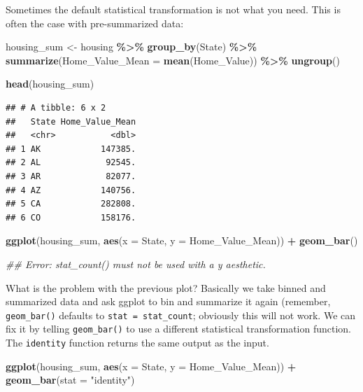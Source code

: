 \documentclass[
]{book}
\newenvironment{Shaded}{\begin{snugshade}}{\end{snugshade}}
\newcommand{\CommentTok}[1]{\textcolor[rgb]{0.56,0.35,0.01}{\textit{#1}}}
\newcommand{\DataTypeTok}[1]{\textcolor[rgb]{0.13,0.29,0.53}{#1}}
\newcommand{\KeywordTok}[1]{\textcolor[rgb]{0.13,0.29,0.53}{\textbf{#1}}}
\newcommand{\NormalTok}[1]{#1}
\newcommand{\OperatorTok}[1]{\textcolor[rgb]{0.81,0.36,0.00}{\textbf{#1}}}
\newcommand{\StringTok}[1]{\textcolor[rgb]{0.31,0.60,0.02}{#1}}
\begin{document}
Sometimes the default statistical transformation is not what you need. This is often the case with pre-summarized data:

\begin{Shaded}
\begin{Highlighting}[]
\NormalTok{housing\_sum \textless{}{-}}\StringTok{ }
\StringTok{  }\NormalTok{housing }\OperatorTok{\%\textgreater{}\%}
\StringTok{  }\KeywordTok{group\_by}\NormalTok{(State) }\OperatorTok{\%\textgreater{}\%}
\StringTok{  }\KeywordTok{summarize}\NormalTok{(}\DataTypeTok{Home\_Value\_Mean =} \KeywordTok{mean}\NormalTok{(Home\_Value)) }\OperatorTok{\%\textgreater{}\%}
\StringTok{  }\KeywordTok{ungroup}\NormalTok{()}

\KeywordTok{head}\NormalTok{(housing\_sum)}
\end{Highlighting}
\end{Shaded}

\begin{verbatim}
## # A tibble: 6 x 2
##   State Home_Value_Mean
##   <chr>           <dbl>
## 1 AK            147385.
## 2 AL             92545.
## 3 AR             82077.
## 4 AZ            140756.
## 5 CA            282808.
## 6 CO            158176.
\end{verbatim}

\begin{Shaded}
\begin{Highlighting}[]
\KeywordTok{ggplot}\NormalTok{(housing\_sum, }\KeywordTok{aes}\NormalTok{(}\DataTypeTok{x =}\NormalTok{ State, }\DataTypeTok{y =}\NormalTok{ Home\_Value\_Mean)) }\OperatorTok{+}\StringTok{ }
\StringTok{  }\KeywordTok{geom\_bar}\NormalTok{()}

\CommentTok{\#\# Error: stat\_count() must not be used with a y aesthetic.  }
\end{Highlighting}
\end{Shaded}

What is the problem with the previous plot? Basically we take binned and summarized data and ask ggplot to bin and summarize it again (remember, \texttt{geom\_bar()} defaults to \texttt{stat\ =\ stat\_count}; obviously this will not work. We can fix it by telling \texttt{geom\_bar()} to use a different statistical transformation function. The \texttt{identity} function returns the same output as the input.

\begin{Shaded}
\begin{Highlighting}[]
\KeywordTok{ggplot}\NormalTok{(housing\_sum, }\KeywordTok{aes}\NormalTok{(}\DataTypeTok{x =}\NormalTok{ State, }\DataTypeTok{y =}\NormalTok{ Home\_Value\_Mean)) }\OperatorTok{+}\StringTok{ }
\StringTok{  }\KeywordTok{geom\_bar}\NormalTok{(}\DataTypeTok{stat =} \StringTok{"identity"}\NormalTok{)}
\end{Highlighting}
\end{Shaded}
\end{document}
